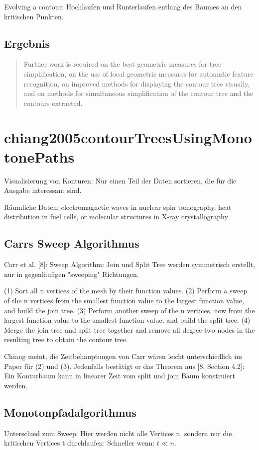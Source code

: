 \cite[S.~53]{carr2010flexibleIsosurfaces} Evolving a contour: Hochlaufen und Runterlaufen entlang des Baumes an den kritischen Punkten.


\subsection{Ergebnis}

\blockcquote[S.~56]{carr2010flexibleIsosurfaces}{Further work is required on the best geometric measures for tree simplification, on the use of local geometric measures for automatic feature recognition, on improved methods for displaying the contour tree visually, and on methods for simultaneous simplification of the contour tree and the contours extracted.}


\section{chiang2005contourTreesUsingMonotonePaths}
\cite{chiang2005contourTreesUsingMonotonePaths}

Visualisierung von Konturen: Nur einen Teil der Daten sortieren, die für die Ausgabe interessant sind.

Räumliche Daten: electromagnetic waves in nuclear spin tomography, heat distribution
in fuel cells, or molecular structures in X-ray crystallography

\subsection{Carrs Sweep Algorithmus}
Carr et al. [8]: Sweep Algorithm: Join und Split Tree werden symmetrisch erstellt, nur in gegenläufigen "sweeping" Richtungen.

(1) Sort all n vertices of the mesh by their function values.
(2) Perform a sweep of the n vertices from the smallest function value to the largest function value, and build the join tree.
(3) Perform another sweep of the n vertices, now from the largest function value to the smallest function value, and build the split tree.
(4) Merge the join tree and split tree together and remove all degree-two nodes in the resulting tree to obtain the contour tree.

Chiang meint, die Zeitbehauptungen von Carr wären leicht unterschiedlich im Paper für (2) und (3). Jedenfalls bestätigt er das Theorem aus [8, Section 4.2]: Ein Konturbaum kann in linearer Zeit vom split und join Baum konstruiert werden.


\subsection{Monotonpfadalgorithmus}
Unterschied zum Sweep: Hier werden nicht alle Vertices n, sondern nur die kritischen Vertices t durchlaufen: Schneller wenn: $t \ll n$.


